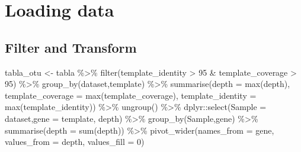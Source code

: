 \documentclass[
  letterpaper,
  DIV=11,
  numbers=noendperiod]{scrartcl}
\newenvironment{Shaded}{\begin{snugshade}}{\end{snugshade}}
\newcommand{\AttributeTok}[1]{\textcolor[rgb]{0.40,0.45,0.13}{#1}}
\newcommand{\CommentTok}[1]{\textcolor[rgb]{0.37,0.37,0.37}{#1}}
\newcommand{\DecValTok}[1]{\textcolor[rgb]{0.68,0.00,0.00}{#1}}
\newcommand{\FunctionTok}[1]{\textcolor[rgb]{0.28,0.35,0.67}{#1}}
\newcommand{\NormalTok}[1]{\textcolor[rgb]{0.00,0.23,0.31}{#1}}
\newcommand{\OtherTok}[1]{\textcolor[rgb]{0.00,0.23,0.31}{#1}}
\newcommand{\SpecialCharTok}[1]{\textcolor[rgb]{0.37,0.37,0.37}{#1}}
\newcommand{\StringTok}[1]{\textcolor[rgb]{0.13,0.47,0.30}{#1}}
\begin{document}
\hypertarget{loading-data}{%
\section{Loading data}\label{loading-data}}

\begin{Shaded}
\end{Shaded}

\hypertarget{filter-and-transform}{%
\subsection{Filter and Transform}\label{filter-and-transform}}

\begin{Shaded}
\begin{Highlighting}[]
\NormalTok{tabla\_otu }\OtherTok{\textless{}{-}}\NormalTok{ tabla }\SpecialCharTok{\%\textgreater{}\%} 
  \FunctionTok{filter}\NormalTok{(template\_identity }\SpecialCharTok{\textgreater{}} \DecValTok{95} \SpecialCharTok{\&}\NormalTok{ template\_coverage }\SpecialCharTok{\textgreater{}} \DecValTok{95}\NormalTok{) }\SpecialCharTok{\%\textgreater{}\%} 
  \FunctionTok{group\_by}\NormalTok{(dataset,template) }\SpecialCharTok{\%\textgreater{}\%} 
  \FunctionTok{summarise}\NormalTok{(}\AttributeTok{depth =} \FunctionTok{max}\NormalTok{(depth), }
            \AttributeTok{template\_coverage =} \FunctionTok{max}\NormalTok{(template\_coverage), }
            \AttributeTok{template\_identity =} \FunctionTok{max}\NormalTok{(template\_identity)) }\SpecialCharTok{\%\textgreater{}\%} 
  \FunctionTok{ungroup}\NormalTok{() }\SpecialCharTok{\%\textgreater{}\%} 
\NormalTok{  dplyr}\SpecialCharTok{::}\FunctionTok{select}\NormalTok{(}\AttributeTok{Sample =}\NormalTok{ dataset,}\AttributeTok{gene =}\NormalTok{ template, depth) }\SpecialCharTok{\%\textgreater{}\%}
  \FunctionTok{group\_by}\NormalTok{(Sample,gene) }\SpecialCharTok{\%\textgreater{}\%} 
  \FunctionTok{summarise}\NormalTok{(}\AttributeTok{depth =} \FunctionTok{sum}\NormalTok{(depth)) }\SpecialCharTok{\%\textgreater{}\%} 
  \FunctionTok{pivot\_wider}\NormalTok{(}\AttributeTok{names\_from =}\NormalTok{ gene, }\AttributeTok{values\_from =}\NormalTok{ depth, }\AttributeTok{values\_fill =} \DecValTok{0}\NormalTok{)}
\end{Highlighting}
\end{Shaded}
\end{document}

